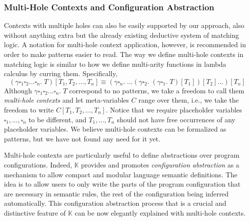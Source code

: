 \documentclass[acmsmall,review,anonymous]{acmart}
\newcommand{\K}{$\mathbb{K}$\xspace}
\newcommand{\ddd}{,\dots,}
\newcommand{\hole}{\square}
\begin{document}
\subsubsection{Multi-Hole Contexts and Configuration Abstraction}
\label{sec:cfg-abstraction}

Contexts with multiple holes can also be easily supported by our approach,
also without anything extra but the already existing deductive system of
matching logic.
A notation for multi-hole context application, however, is recommended in
order to make patterns easier to read. 
The way we define multi-hole contexts in matching logic
is similar to how we define multi-arity functions in lambda calculus
by curring them.
Specifically,
$$
(\gamma \hole_1 \hole_2 \dots \hole_n . \; T)[T_1,T_2,\dots,T_n]
\equiv (\gamma \hole_n .\; \dots 
(\gamma\hole_2.\;(\gamma\hole_1.\;T)[T_1])[T_2]\dots)[T_n]
$$
Although $\gamma \hole_1 \hole_2 \dots \hole_n . \; T$ correspond to no
patterns, we take a freedom to call them \emph{multi-hole contexts} and
let meta-variables $C$ range over them, i.e., we take the freedom to write
$C[T_1,T_2,\dots,T_n]$.
Notice that we require placeholder variables
$\hole_1 \ddd \hole_n$ to be different,
and $T_1 \ddd T_n$ should not have free occurrences
of any placeholder variables.
We believe multi-hole contexts can be formalized as patterns, but we have
not found any need for it yet.

Multi-hole contexts are particularly useful to define abstractions over
program configurations.
Indeed, \K provides and promotes \emph{configuration abstraction} as a
mechanism to allow compact and modular language semantic definitions.
The idea is to allow users to only write the parts of the program
configuration that are necessary in semantic rules, the rest of the
configuration being inferred automatically.
This configuration abstraction process that is a crucial and distinctive
feature of \K can be now elegantly explained with multi-hole contexts.
\end{document}
